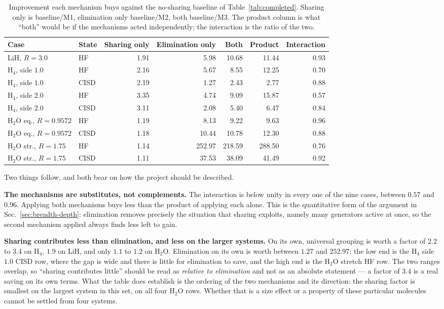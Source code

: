 \documentclass[10pt]{article}
\begin{document}
\begin{table}[!htbp]
\centering
\scriptsize
\caption{Improvement each mechanism buys against the no-sharing baseline of Table~\ref{tab:completed}. Sharing only is baseline/M1, elimination only baseline/M2, both baseline/M3. The product column is what ``both'' would be if the mechanisms acted independently; the interaction is the ratio of the two.}
\label{tab:attribution}
\begin{tabular}{llrrrrr}
\toprule
Case & State & Sharing only & Elimination only & Both & Product & Interaction \\
\midrule
LiH, $R{=}3.0$ & HF & 1.91 & 5.98 & 10.68 & 11.44 & 0.93 \\
H$_4$, side $1.0$ & HF & 2.16 & 5.67 & 8.55 & 12.25 & 0.70 \\
H$_4$, side $1.0$ & CISD & 2.19 & 1.27 & 2.43 & 2.77 & 0.88 \\
H$_4$, side $2.0$ & HF & 3.35 & 4.74 & 9.09 & 15.87 & 0.57 \\
H$_4$, side $2.0$ & CISD & 3.11 & 2.08 & 5.40 & 6.47 & 0.84 \\
H$_2$O eq., $R{=}0.9572$ & HF & 1.19 & 8.13 & 9.22 & 9.63 & 0.96 \\
H$_2$O eq., $R{=}0.9572$ & CISD & 1.18 & 10.44 & 10.78 & 12.30 & 0.88 \\
H$_2$O str., $R{=}1.75$ & HF & 1.14 & 252.97 & 218.59 & 288.50 & 0.76 \\
H$_2$O str., $R{=}1.75$ & CISD & 1.11 & 37.53 & 38.09 & 41.49 & 0.92 \\
\bottomrule
\end{tabular}
\end{table}

Two things follow, and both bear on how the project should be described.

\textbf{The mechanisms are substitutes, not complements.} The interaction is below
unity in every one of the nine cases, between $0.57$ and $0.96$. Applying both
mechanisms buys less than the product of applying each alone. This is the
quantitative form of the argument in Sec.~\ref{sec:breadth-depth}: elimination
removes precisely the situation that sharing exploits, namely many generators
active at once, so the second mechanism applied always finds less left to gain.

\textbf{Sharing contributes less than elimination, and less on the larger
systems.} On its own, universal grouping is worth a factor of $2.2$ to $3.4$ on
H$_4$, $1.9$ on LiH, and only $1.1$ to $1.2$ on H$_2$O. Elimination on its own is
worth between $1.27$ and $252.97$: the low end is the H$_4$ side $1.0$ CISD row,
where the gap is wide and there is little for elimination to save, and the high
end is the H$_2$O stretch HF row. The two ranges overlap, so ``sharing contributes
little'' should be read as \emph{relative to elimination} and not as an absolute
statement --- a factor of $3.4$ is a real saving on its own terms. What the table
does establish is the ordering of the two mechanisms and its direction: the
sharing factor is smallest on the largest system in this set, on all four H$_2$O
rows. Whether that is a size effect or a property of these particular molecules
cannot be settled from four systems.
\end{document}
